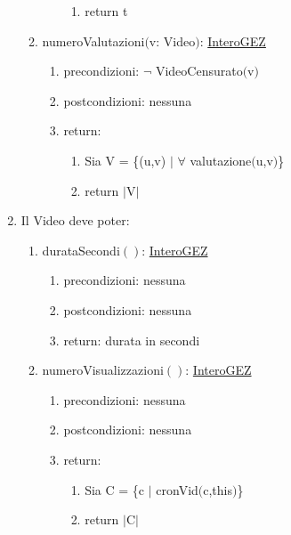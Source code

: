 \documentclass{article}
\begin{document}
\begin{enumerate}
\begin{enumerate}
\begin{enumerate}
\begin{enumerate}
                \item return t
            \end{enumerate}
        \end{enumerate}
        \newpage
        \item numeroValutazioni$($v: Video$)$: \hyperref[sec:TipoInteroGEZ]{InteroGEZ}
        \begin{enumerate}
            \item precondizioni: $\neg$ VideoCensurato$($v$)$
            \item postcondizioni: nessuna
            \item return:
            \begin{enumerate}
                \item Sia V = \{(u,v) $|$ $\forall$ valutazione$($u,v$)$\}
                \item return $\mid$V$\mid$
            \end{enumerate}
        \end{enumerate}
    \end{enumerate}
    \newpage
    \item\label{sec:OperazioniVideo} Il Video deve poter:
    \begin{enumerate}
        \item durataSecondi$()$: \hyperref[sec:TipoInteroGEZ]{InteroGEZ}
        \begin{enumerate}
            \item precondizioni: nessuna
            \item postcondizioni: nessuna
            \item return: durata in secondi
        \end{enumerate}
        \newpage
        \item numeroVisualizzazioni$()$: \hyperref[sec:TipoInteroGEZ]{InteroGEZ}
        \begin{enumerate}
            \item precondizioni: nessuna
            \item postcondizioni: nessuna
            \item return:
            \begin{enumerate}
                \item Sia C = \{c $|$ cronVid$($c,this$)$\}
                \item return $\mid$C$\mid$
            \end{enumerate}
        \end{enumerate}

\end{enumerate}
\end{enumerate}
\end{document}
